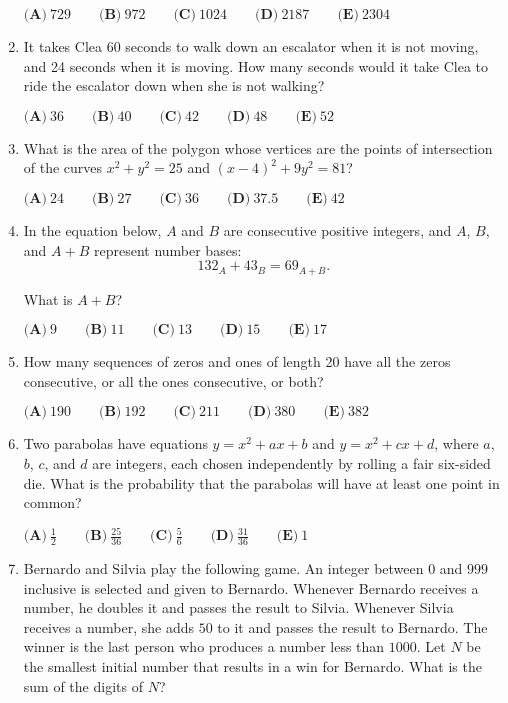 \documentclass{article}
\begin{document}
\begin{enumerate}[label=\arabic*., itemsep=0.5em]
$\textbf{(A)}\ 729\qquad\textbf{(B)}\ 972\qquad\textbf{(C)}\ 1024\qquad\textbf{(D)}\ 2187\qquad\textbf{(E)}\ 2304 $\par \vspace{0.5em}\item It takes Clea 60 seconds to walk down an escalator when it is not moving, and 24 seconds when it is moving. How many seconds would it take Clea to ride the escalator down when she is not walking?

$\textbf{(A)}\ 36\qquad\textbf{(B)}\ 40\qquad\textbf{(C)}\ 42\qquad\textbf{(D)}\ 48\qquad\textbf{(E)}\ 52 $\par \vspace{0.5em}\item What is the area of the polygon whose vertices are the points of intersection of the curves $x^2 + y^2 =25$ and $(x-4)^2 + 9y^2 = 81$?

$\textbf{(A)}\ 24\qquad\textbf{(B)}\ 27\qquad\textbf{(C)}\ 36\qquad\textbf{(D)}\ 37.5\qquad\textbf{(E)}\ 42$\par \vspace{0.5em}\item In the equation below, $A$ and $B$ are consecutive positive integers, and $A$, $B$, and $A+B$ represent number bases: 
\begin{equation*}
132_A+43_B=69_{A+B}.
\end{equation*}

What is $A+B$?

$\textbf{(A)}\ 9\qquad\textbf{(B)}\ 11\qquad\textbf{(C)}\ 13\qquad\textbf{(D)}\ 15\qquad\textbf{(E)}\ 17 $\par \vspace{0.5em}\item How many sequences of zeros and ones of length 20 have all the zeros consecutive, or all the ones consecutive, or both?

$\textbf{(A)}\ 190\qquad\textbf{(B)}\ 192\qquad\textbf{(C)}\ 211\qquad\textbf{(D)}\ 380\qquad\textbf{(E)}\ 382 $\par \vspace{0.5em}\item Two parabolas have equations $y= x^2 + ax +b$ and $y= x^2 + cx +d$, where $a$, $b$, $c$, and $d$ are integers, each chosen independently by rolling a fair six-sided die. What is the probability that the parabolas will have at least one point in common?

$\textbf{(A)}\ \frac{1}{2}\qquad\textbf{(B)}\ \frac{25}{36}\qquad\textbf{(C)}\ \frac{5}{6}\qquad\textbf{(D)}\ \frac{31}{36}\qquad\textbf{(E)}\ 1 $\par \vspace{0.5em}\item Bernardo and Silvia play the following game. An integer between $0$ and $999$ inclusive is selected and given to Bernardo. Whenever Bernardo receives a number, he doubles it and passes the result to Silvia. Whenever Silvia receives a number, she adds $50$ to it and passes the result to Bernardo. The winner is the last person who produces a number less than $1000$. Let $N$ be the smallest initial number that results in a win for Bernardo. What is the sum of the digits of $N$?


\end{enumerate}
\end{document}
